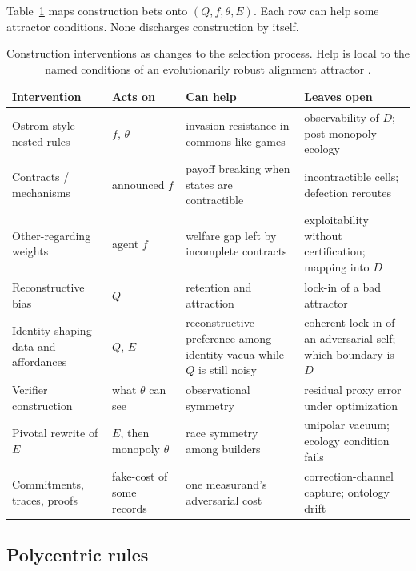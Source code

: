 \documentclass[11pt]{article}
\begin{document}
Table~\ref{tab:interventions} maps construction bets onto \((Q,f,\theta,E)\). Each row can help some attractor conditions. None discharges construction by itself.

\begin{table}[t]
\centering
\small
\caption{Construction interventions as changes to the selection process. Help is local to the named conditions of an evolutionarily robust alignment attractor \parencite{zarncke2026selection}.}
\label{tab:interventions}
\begin{tabular}{>{\raggedright\arraybackslash}p{2.9cm}>{\raggedright\arraybackslash}p{1.8cm}>{\raggedright\arraybackslash}p{3.5cm}>{\raggedright\arraybackslash}p{3.5cm}}
\toprule
Intervention & Acts on & Can help & Leaves open \\
\midrule
Ostrom-style nested rules \parencite{ostrom1990} & \(f\), \(\theta\) & invasion resistance in commons-like games & observability of \(D\); post-monopoly ecology \\
Contracts / mechanisms \parencite{grossman1986,hart1988,huang2026} & announced \(f\) & payoff breaking when states are contractible & incontractible cells; defection reroutes \\
Other-regarding weights \parencite{huang2026} & agent \(f\) & welfare gap left by incomplete contracts & exploitability without certification; mapping into \(D\) \\
Reconstructive bias \parencite{buskell2017} & \(Q\) & retention and attraction & lock-in of a bad attractor \\
Identity-shaping data and affordances \parencite{douglas2026self} & \(Q\), \(E\) & reconstructive preference among identity vacua while \(Q\) is still noisy & coherent lock-in of an adversarial self; which boundary is \(D\) \\
Verifier construction \parencite{zarncke2026verifier} & what \(\theta\) can see & observational symmetry & residual proxy error under optimization \\
Pivotal rewrite of \(E\) \parencite{yudkowsky2022} & \(E\), then monopoly \(\theta\) & race symmetry among builders & unipolar vacuum; ecology condition fails \\
Commitments, traces, proofs & fake-cost of some records & one measurand's adversarial cost & correction-channel capture; ontology drift \\
\bottomrule
\end{tabular}
\end{table}

\subsection{Polycentric rules}
\end{document}
